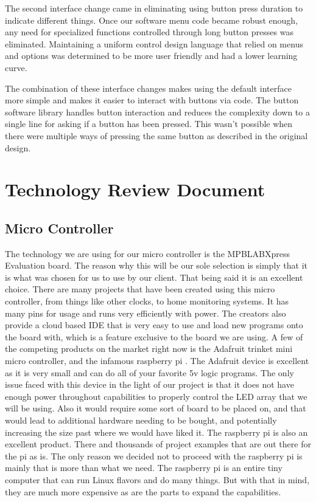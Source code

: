 \documentclass[onecolumn, draftclsnofoot,10pt, compsoc]{IEEEtran}
\begin{document}
The second interface change came in eliminating using button press duration to indicate different things. Once our software menu code became robust enough, any need for specialized functions controlled through long button presses was eliminated. Maintaining a uniform control design language that relied on menus and options was determined to be more user friendly and had a lower learning curve.

The combination of these interface changes makes using the default interface more simple and makes it easier to interact with buttons via code. The button software library handles button interaction and reduces the complexity down to a single line for asking if a button has been pressed. This wasn’t possible when there were multiple ways of pressing the same button as described in the original design.


\section{Technology Review Document}
\subsection{Micro Controller}
The technology we are using for our micro controller is the MPBLABXpress Evaluation board.
The reason why this will be our sole selection is simply that it is what was chosen for us to use by our client.
That being said it is an excellent choice.
There are many projects that have been created using this micro controller, from things like other clocks, to home monitoring systems.
It has many pins for usage and runs very efficiently with power. The creators also provide a cloud based IDE \cite{cloudIDE} that is very easy to use and load new programs onto the board with, which is a feature exclusive to the board we are using.
A few of the competing products on the market right now is the Adafruit trinket \cite{trinket} mini micro controller, and the infamous raspberry pi \cite{pi}.
The Adafruit device is excellent as it is very small and can do all of your favorite 5v logic programs.
The only issue faced with this device in the light of our project is that it does not have enough power throughout capabilities to properly control the LED array that we will be using.
Also it would require some sort of board to be placed on, and that would lead to additional hardware needing to be bought, and potentially increasing the size past where we would have liked it.
The raspberry pi is also an excellent product. There and thousands of project examples that are out there for the pi as is.
The only reason we decided not to proceed with the raspberry pi is mainly that is more than what we need.
The raspberry pi is an entire tiny computer that can run Linux flavors and do many things.
But with that in mind, they are much more expensive as are the parts to expand the capabilities.
\end{document}
